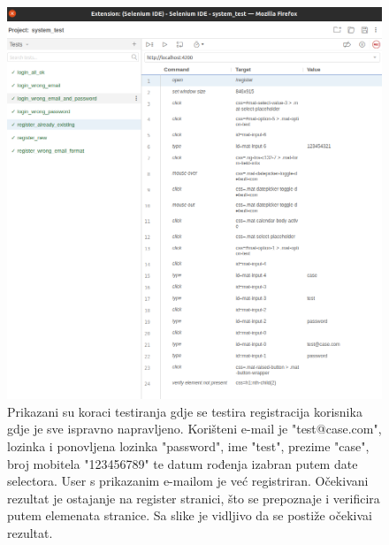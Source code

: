             \begin{figure}[H]
                \includegraphics[width=\textwidth]{slike/tests_system/register_already_existing.png} %
                \caption{Prikazani su koraci testiranja gdje se testira registracija korisnika gdje je sve ispravno napravljeno. Korišteni e-mail je "test@case.com", lozinka i ponovljena lozinka "password", ime "test", prezime "case", broj mobitela "123456789" te datum rođenja izabran putem date selectora. User s prikazanim e-mailom je već registriran. Očekivani rezultat je ostajanje na register stranici, što se prepoznaje i verificira putem elemenata stranice. Sa slike je vidljivo da se postiže očekivai rezultat.}
                \label{fig:struktura} %
            \end{figure}

